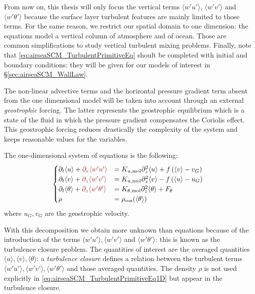 From now on, this thesis will only focus the vertical terms
$\langle w' u'\rangle$, $\langle w' v'\rangle$ and
$\langle w' \theta'\rangle$
because the surface layer turbulent features are mainly limited
to those terms. For the same reason, we restrict our spatial
domain to one dimension: the equations model a vertical column
of atmosphere and of ocean. Those are common simplifications to
study vertical turbulent mixing problems.
Finally, note that \eqref{eq:airseaSCM_TurbulentPrimitiveEq}
shoult be completed with initial and boundary conditions:
they will be given for our models of interest in
\S\ref{sec:airseaSCM_WallLaw}.
\par
The non-linear advective terms and the horizontal
pressure gradient term absent from the one dimensional model
will be taken into account through an external \textit{geostrophic}
forcing. The latter represents the geostrophic equilibrium which
is a state of the fluid in which the pressure gradient compensates
the Coriolis effect. This geostrophic forcing reduces
drastically the complexity of the system and keeps
reasonable values
for the variables.
\par
The one-dimensional system of
equations is the following:
\begin{equation}
	\label{eq:airseaSCM_TurbulentPrimitiveEq1D}
\begin{cases}
	\partial_t \langle u \rangle
	+ \emphase{\partial_z \langle w' u'\rangle}
	&=
	K_{u, {\rm mol}} \partial_z^2 \langle u\rangle
	+ f \left(\langle v\rangle - v_G\right)
	\\
	\partial_t \langle v\rangle
	+ \emphase{\partial_z \langle w' v'\rangle}
	&=
	K_{u, {\rm mol}} \partial_z^2 \langle v\rangle
	- f \left(\langle u\rangle-u_G\right)\\
	\partial_t \langle\theta\rangle
	+ \emphase{\partial_z \langle w' \theta'\rangle}&=
	K_{\theta, {\rm mol}} \partial_z^2 \langle\theta\rangle
	+ F_\theta\\
	\rho &= \rho_{\rm eos}(\langle\theta\rangle)
\end{cases}
\end{equation}
where $u_G, v_G$ are the geostrophic velocity.
\par
With this decomposition we obtain more unknown than
equations because of the introduction of the terms
$\langle w' u'\rangle, \langle w' v'\rangle$
and $\langle w' \theta'\rangle$:
this is known as the turbulence closure problem.
The quantities of interest are the averaged quantities
$\langle u\rangle, \langle v\rangle, \langle \theta \rangle$:
a \textit{turbulence closure} defines a relation between
the turbulent terms $\langle w' u'\rangle, \langle w' v'\rangle,
\langle w' \theta'\rangle$ and those averaged quantities.
The density $\rho$ is not used explicitly
in \ref{eq:airseaSCM_TurbulentPrimitiveEq1D}
but appear in the turbulence closure.
